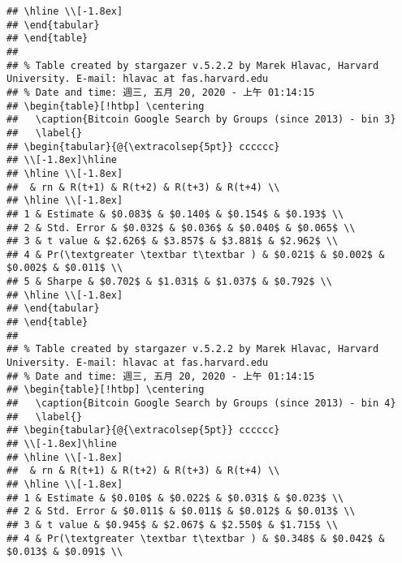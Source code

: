 \documentclass[
]{article}
\begin{document}
\begin{verbatim}
## \hline \\[-1.8ex] 
## \end{tabular} 
## \end{table} 
## 
## % Table created by stargazer v.5.2.2 by Marek Hlavac, Harvard University. E-mail: hlavac at fas.harvard.edu
## % Date and time: 週三, 五月 20, 2020 - 上午 01:14:15
## \begin{table}[!htbp] \centering 
##   \caption{Bitcoin Google Search by Groups (since 2013) - bin 3} 
##   \label{} 
## \begin{tabular}{@{\extracolsep{5pt}} cccccc} 
## \\[-1.8ex]\hline 
## \hline \\[-1.8ex] 
##  & rn & R(t+1) & R(t+2) & R(t+3) & R(t+4) \\ 
## \hline \\[-1.8ex] 
## 1 & Estimate & $0.083$ & $0.140$ & $0.154$ & $0.193$ \\ 
## 2 & Std. Error & $0.032$ & $0.036$ & $0.040$ & $0.065$ \\ 
## 3 & t value & $2.626$ & $3.857$ & $3.881$ & $2.962$ \\ 
## 4 & Pr(\textgreater \textbar t\textbar ) & $0.021$ & $0.002$ & $0.002$ & $0.011$ \\ 
## 5 & Sharpe & $0.702$ & $1.031$ & $1.037$ & $0.792$ \\ 
## \hline \\[-1.8ex] 
## \end{tabular} 
## \end{table} 
## 
## % Table created by stargazer v.5.2.2 by Marek Hlavac, Harvard University. E-mail: hlavac at fas.harvard.edu
## % Date and time: 週三, 五月 20, 2020 - 上午 01:14:15
## \begin{table}[!htbp] \centering 
##   \caption{Bitcoin Google Search by Groups (since 2013) - bin 4} 
##   \label{} 
## \begin{tabular}{@{\extracolsep{5pt}} cccccc} 
## \\[-1.8ex]\hline 
## \hline \\[-1.8ex] 
##  & rn & R(t+1) & R(t+2) & R(t+3) & R(t+4) \\ 
## \hline \\[-1.8ex] 
## 1 & Estimate & $0.010$ & $0.022$ & $0.031$ & $0.023$ \\ 
## 2 & Std. Error & $0.011$ & $0.011$ & $0.012$ & $0.013$ \\ 
## 3 & t value & $0.945$ & $2.067$ & $2.550$ & $1.715$ \\ 
## 4 & Pr(\textgreater \textbar t\textbar ) & $0.348$ & $0.042$ & $0.013$ & $0.091$ \\ 

\end{verbatim}
\end{document}
